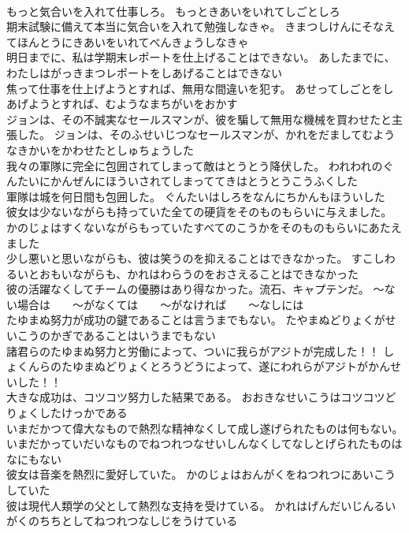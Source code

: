 \documentclass[8pt]{extreport}
\begin{document}
\begin{CJK}{UTF8}{min}
\\	もっと気合いを入れて仕事しろ。	もっときあいをいれてしごとしろ 
\\	期末試験に備えて本当に気合いを入れて勉強しなきゃ。	きまつしけんにそなえてほんとうにきあいをいれてべんきょうしなきゃ 
\\	明日までに、私は学期末レポートを仕上げることはできない。	あしたまでに、わたしはがっきまつレポートをしあげることはできない 
\\	焦って仕事を仕上げようとすれば、無用な間違いを犯す。	あせってしごとをしあげようとすれば、むようなまちがいをおかす 
\\	ジョンは、その不誠実なセールスマンが、彼を騙して無用な機械を買わせたと主張した。	ジョンは、そのふせいじつなセールスマンが、かれをだましてむようなきかいをかわせたとしゅちょうした 
\\	我々の軍隊に完全に包囲されてしまって敵はとうとう降伏した。	われわれのぐんたいにかんぜんにほういされてしまっててきはとうとうこうふくした 
\\	軍隊は城を何日間も包囲した。	ぐんたいはしろをなんにちかんもほういした 
\\	彼女は少ないながらも持っていた全ての硬貨をそのものもらいに与えました。	かのじょはすくないながらもっていたすべてのこうかをそのものもらいにあたえました 
\\	少し悪いと思いながらも、彼は笑うのを抑えることはできなかった。	すこしわるいとおもいながらも、かれはわらうのをおさえることはできなかった 
\\	彼の活躍なくしてチームの優勝はあり得なかった。流石、キャプテンだ。	～ない場合は　　～がなくては　　～がなければ　　～なしには
\\	たゆまぬ努力が成功の鍵であることは言うまでもない。	たやまぬどりょくがせいこうのかぎであることはいうまでもない 
\\	諸君らのたゆまぬ努力と労働によって、ついに我らがアジトが完成した！！	しょくんらのたゆまぬどりょくとろうどうによって、遂にわれらがアジトがかんせいした！！ 
\\	大きな成功は、コツコツ努力した結果である。	おおきなせいこうはコツコツどりょくしたけっかである 
\\	いまだかつて偉大なもので熱烈な精神なくして成し遂げられたものは何もない。	いまだかっていだいなものでねつれつなせいしんなくしてなしとげられたものはなにもない 
\\	彼女は音楽を熱烈に愛好していた。	かのじょはおんがくをねつれつにあいこうしていた 
\\	彼は現代人類学の父として熱烈な支持を受けている。	かれはげんだいじんるいがくのちちとしてねつれつなしじをうけている 

\end{CJK}
\end{document}
